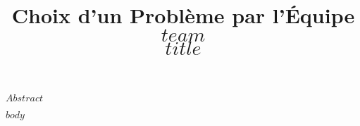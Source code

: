 \documentclass[mstat,12pt]{unswthesis}
\title{Choix d'un Problème par l'Équipe $team$\\[0.5cm]$title$}
\author{\Authornameonly}
\begin{document}
\beforepreface


$Abstract$



\afterpreface





%
%






$body$
\end{document}
